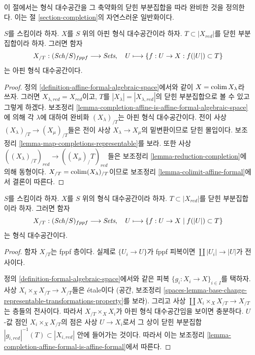 \noindent
이 절에서는 형식 대수공간을 그 축약화의 닫힌 부분집합을 따라 완비한
것을 정의한다. 이는 절 \ref{section-completion}의 자연스러운 일반화이다.

\begin{lemma}
\label{lemma-completion-affine-formal-is-affine-formal}
$S$를 스킴이라 하자. $X$를 $S$ 위의 아핀 형식 대수공간이라 하자.
$T \subset |X_{red}|$를 닫힌 부분집합이라 하자. 그러면 함자
$$
X_{/T} : (\mathit{Sch}/S)_{fppf} \longrightarrow \textit{Sets},\quad
U \longmapsto \{f : U \to X : f(|U|) \subset T\}
$$
는 아핀 형식 대수공간이다.
\end{lemma}

\begin{proof}
정의 \ref{definition-affine-formal-algebraic-space}에서와 같이
$X = \mathop{\mathrm{colim}}\nolimits X_\lambda$라 쓰자. 그러면
$X_{\lambda, red} = X_{red}$이고, $T$를
$|X_\lambda| = |X_{\lambda, red}|$의 닫힌 부분집합으로 볼 수 있고
그렇게 하겠다. 보조정리
\ref{lemma-completion-affine-is-affine-formal-algebraic-space}에 의해
각 $\lambda$에 대하여 완비화 $(X_\lambda)_{/T}$는 아핀 형식
대수공간이다. 전이 사상
$(X_\lambda)_{/T} \to (X_\mu)_{/T}$들은 전이 사상
$X_\lambda \to X_\mu$의 밑변환이므로 닫힌 몰입이다. 보조정리
\ref{lemma-map-completions-representable}를 보라. 또한 사상
$((X_\lambda)_{/T})_{red} \to ((X_\mu)_/T)_{red}$들은 보조정리
\ref{lemma-reduction-completion}에 의해 동형이다.
$X_{/T} = \mathop{\mathrm{colim}}\nolimits (X_\lambda)_{/T}$이므로 보조정리
\ref{lemma-colimit-affine-formal}에서 결론이 따른다.
\end{proof}

\begin{lemma}
\label{lemma-completion-fas-is-fas}
$S$를 스킴이라 하자. $X$를 $S$ 위의 형식 대수공간이라 하자.
$T \subset |X_{red}|$를 닫힌 부분집합이라 하자. 그러면 함자
$$
X_{/T} : (\mathit{Sch}/S)_{fppf} \longrightarrow \textit{Sets},\quad
U \longmapsto \{f : U \to X \mid f(|U|) \subset T\}
$$
는 형식 대수공간이다.
\end{lemma}

\begin{proof}
함자 $X_{/T}$는 fppf 층이다. 실제로
$\{U_i \to U\}$가 fppf 피복이면
$\coprod |U_i| \to |U|$가 전사이다.

\medskip\noindent
정의 \ref{definition-formal-algebraic-space}에서와 같은 피복
$\{g_i : X_i \to X\}_{i \in I}$를 택하자.
사상 $X_i \times_X X_{/T} \to X_{/T}$들은 \'etale이다
(공간, 보조정리
\ref{spaces-lemma-base-change-representable-transformations-property}를 보라).
그리고 사상 $\coprod X_i \times_X X_{/T} \to X_{/T}$는 층들의
전사이다. 따라서 $X_{/T} \times_X X_i$가 아핀 형식
대수공간임을 보이면 충분하다. $U$-값 점인
$X_i \times_X X_{/T}$의 점은 사상 $U \to X_i$로서 그 상이
닫힌 부분집합 $|g_{i, red}|^{-1}(T) \subset |X_{i, red}|$
안에 들어가는 것이다. 따라서 이는 보조정리
\ref{lemma-completion-affine-formal-is-affine-formal}에서 따른다.
\end{proof}

